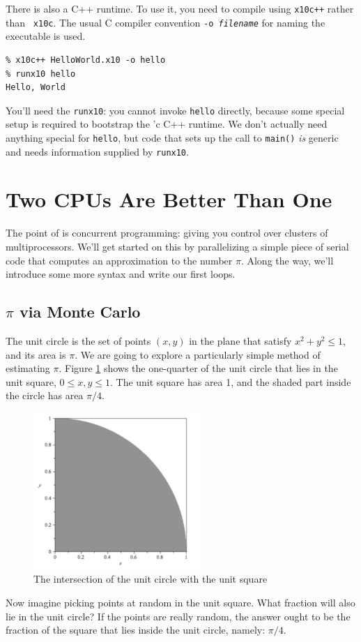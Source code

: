 There is also a C++
runtime.  To use it, you need to compile using {\tt x10c++} rather than {\tt
x10c}.  The usual C compiler convention {\tt -o {\em filename}} for naming the
executable is used.
\begin{verbatim}
% x10c++ HelloWorld.x10 -o hello
% runx10 hello
Hello, World
\end{verbatim} 
You'll need the {\tt runx10}: you cannot invoke {\tt hello} directly, because
some special setup is required to bootstrap the \Xten'c C++ runtime.
We don't actually need anything special
for {\tt hello}, but \Xten{} code that sets up the call to {\tt main()} {\em is}
generic and needs information supplied by {\tt runx10}.

\section{Two CPUs Are Better Than One}

The point of \Xten{} is concurrent programming: giving you control over clusters of 
multiprocessors.   We'll get started on this by parallelizing a simple piece of serial
code that computes an approximation to the number $\pi$.  Along the way, we'll
introduce some more \Xten{} syntax and write our first loops.

\subsection{$\pi$ via Monte Carlo}

The unit circle is the set of points $(x,y)$ in the plane that satisfy $x^{2} + y^{2} \le 1$,
and its area is $\pi$.  We are going to explore a particularly simple method of estimating
$\pi$.  Figure \ref{fig:cis} shows the one-quarter of the unit circle that lies
in the unit square,  $0 \le  x,y \le 1$.  The unit square has area 1, and the
shaded part inside the circle has area $\pi/4$.  
\begin{figure}[!htbp] 
\begin{center} 
\includegraphics[width=2.5in]{"images/cis3"} 
\caption{The intersection of the unit circle with the unit square}
\label{fig:cis}
\end{center}
\end{figure}
Now imagine picking points at random in the unit square.  What fraction
will also lie in the unit circle?  If the points are really random, the
answer ought to be the fraction of the square that lies inside the unit circle,
namely: $\pi/4$.

